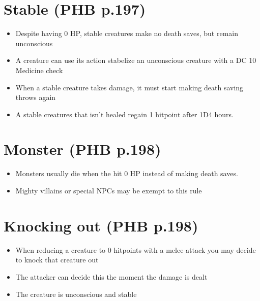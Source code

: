 \documentclass[a4paper]{article}
\begin{document}
\section{Stable \small (PHB p.197)}
\begin{itemize}
\item Despite having 0 HP, stable creatures make no death saves, but remain unconscious
\item A creature can use its action stabelize an unconscious creature with a DC 10 Medicine check
\item When a stable creature takes damage, it must start making death saving throws again
\item A stable creatures that isn't healed regain 1 hitpoint after 1D4 hours.
\end{itemize} 
\section{Monster \small (PHB p.198)}
\begin{itemize}
\item Monsters usually die when the hit 0 HP instead of making death saves.
\item Mighty villains or special NPCs may be exempt to this rule
\end{itemize}
\section{Knocking out \small (PHB p.198)}
\begin{itemize}
\item When reducing a creature to 0 hitpoints with a melee attack you may decide to knock that creature out
\item The attacker can decide this the moment the damage is dealt
\item The creature is unconscious and stable
\end{itemize}
\end{document}
